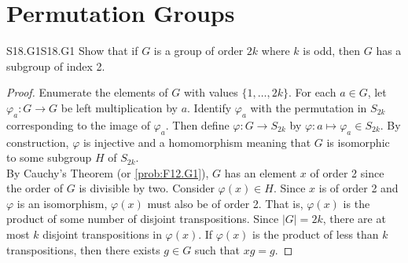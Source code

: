 \documentclass[../AlgebraQualSolutions.tex]{subfiles}
\begin{document}
\section{Permutation Groups}

\begin{prob}{S18.G1}{S18.G1}
    Show that if $G$ is a group of order $2k$ where $k$ is odd, then $G$ has a subgroup of index 2.
\end{prob}

\begin{proof}
    Enumerate the elements of $G$ with values $\{1,\ldots, 2k\}$. For each $a \in G$, let $\varphi_a: G \to G$ be left multiplication by $a$. Identify $\varphi_a$ with the permutation in $S_{2k}$ corresponding to the image of $\varphi_a$. Then define $\varphi: G \to S_{2k}$ by $\varphi: a \mapsto \varphi_{a} \in S_{2k}$. By construction, $\varphi$ is injective and a homomorphism meaning that $G$ is isomorphic to some subgroup $H$ of $S_{2k}$.\\

    By Cauchy's Theorem (or \ref{prob:F12.G1}), $G$ has an element $x$ of order 2 since the order of $G$ is divisible by two. Consider $\varphi(x) \in H$. Since $x$ is of order 2 and $\varphi$ is an isomorphism, $\varphi(x)$ must also be of order 2. That is, $\varphi(x)$ is the product of some number of disjoint transpositions. Since $|G| = 2k$, there are at most $k$ disjoint transpositions in $\varphi(x)$. If $\varphi(x)$ is the product of less than $k$ transpositions, then there exists $g \in G$ such that $xg = g$. 
\end{proof}
\end{document}
